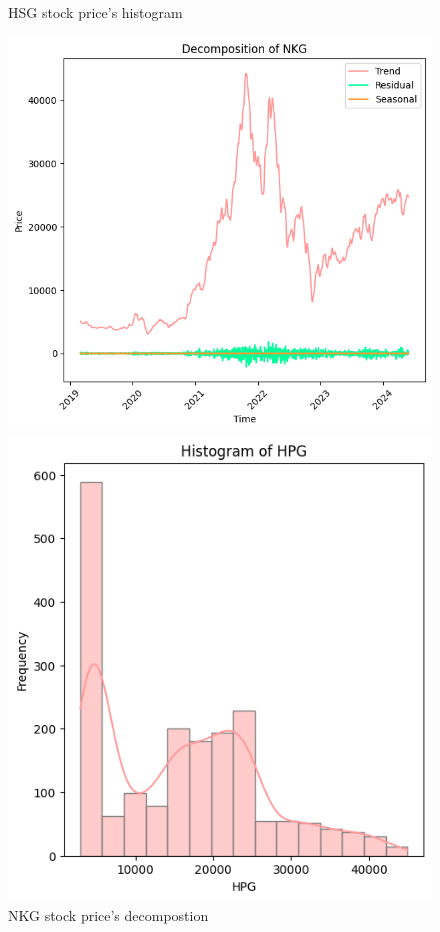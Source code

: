 \documentclass{ieeeojies}
\begin{document}
\begin{figure}[H]
\begin{minipage}{0.23\textwidth}
    \caption{HSG stock price's histogram}
    \label{fig:2}
    \end{minipage}
\end{figure}

\begin{figure}[H]
    \centering
    \begin{minipage}{0.23\textwidth}
    \centering
    \includegraphics[width=1\textwidth]{bibliography/Figure/Decomposition_NKG.png}
    \caption{NKG stock price's decompostion}
    \label{fig:1}
    \end{minipage}
    \hfill
    \begin{minipage}{0.23\textwidth}
    \centering
    \includegraphics[width=1\textwidth]{bibliography/Figure/Histogram_NKG.png}

\end{minipage}
\end{figure}
\end{document}
